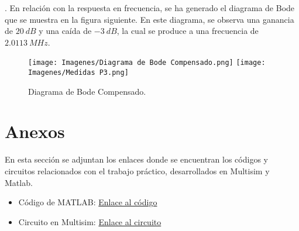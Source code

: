 \documentclass[12pt,A4paper,titlepage]{article}
\begin{document}
\newpage
.\hspace{1mm} En relación con la respuesta en frecuencia, se ha generado el diagrama de Bode que se muestra en la figura siguiente. En este diagrama, se observa una ganancia de \(20~dB\) y una caída de \(-3~dB\), la cual se produce a una frecuencia de \(2.0113~MHz\).

\begin{figure}[!h]
    \centering
    \texttt{[image: Imagenes/Diagrama de Bode Compensado.png]}
    \texttt{[image: Imagenes/Medidas P3.png]}
    \caption{Diagrama de Bode Compensado.}
    
\end{figure}

\newpage
\section{Anexos}
\hspace{1mm} En esta sección se adjuntan los enlaces donde se encuentran los códigos y circuitos relacionados con el trabajo práctico, desarrollados en Multisim y Matlab.

\begin{itemize}
  \item Código de MATLAB: \href{https://drive.google.com/drive/u/1/folders/1tMhJg05OBsu2jBb_01hIpFwt4gK68p9m}{Enlace al código}
    \item Circuito en Multisim: \href{https://drive.google.com/drive/u/1/folders/1RTTx1D0vFVLO-MP1Zpwf79zagK8-XdSH}{Enlace al circuito}
\end{itemize}
\end{document}
